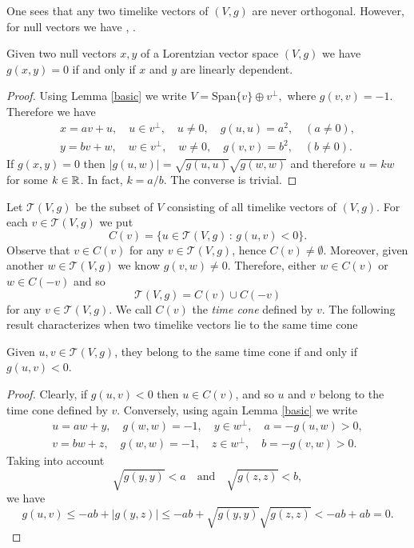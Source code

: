 One sees that any two timelike vectors of $(V,g)$ are never orthogonal.
However, for null vectors we have  \cite[Cor. 1.1.5]{sachs77}, \cite[p. 155]{oneill83}.

\begin{proposition} Given two null vectors $x,y$ of a Lorentzian vector space $(V,g)$ we have
$g(x,y)=0$ if and only if $x$ and $y$ are linearly dependent.
\end{proposition}

\begin{proof}
    Using Lemma \ref{basic} we write $V=\mathrm{Span}\{v\}\oplus v^{\perp},$ where $g(v,v)=-1$. Therefore we have
    \begin{align*}
        x=av+u, \quad u\in v^{\perp}, \quad u\neq 0, \quad g(u,u)=a^2, \quad (a\neq 0),\\
        y=bv+w, \quad w\in v^{\perp}, \quad w\neq 0, \quad g(v,v)=b^2, \quad (b\neq 0).
    \end{align*}
    If $g(x,y)=0$ then $\mid g(u,w)\mid = \sqrt{g(u,u)}\sqrt{g(w,w)}$ and therefore $u=kw$ for some $k\in \mathbb{R}$. In fact, $k=a/b$. The converse is trivial.
\end{proof}

Let $\mathcal{T}(V,g)$ be the subset of $V$ consisting of all timelike vectors of $(V,g)$. For each $v\in \mathcal{T}(V,g)$ we put
\[
C(v)=\{u\in\mathcal{T}(V,g)\, : \, g(u,v)<0 \}.
\]
Observe that $v\in C(v)$ for any $v\in \mathcal{T}(V,g)$, hence $C(v)\neq \emptyset$. Moreover, given another $w\in \mathcal{T}(V,g)$
we know $g(v,w)\neq 0$. Therefore, either $w\in C(v)$ or $w\in C(-v)$ and so
\[
\mathcal{T}(V,g)=C(v) \cup C(-v)
\]
for any $v\in \mathcal{T}(V,g)$. We call $C(v)$ the \emph{time cone} defined by $v$. The following result characterizes
when two timelike vectors lie to the same time cone \cite[Lemma 5.29]{oneill83}

\begin{lemma}\label{time_cone}
Given $u,v\in \mathcal{T}(V,g)$, they belong to the same time cone if and only if $g(u,v)<0$.
\end{lemma}

\begin{proof}
    Clearly, if $g(u,v)<0$ then $u\in C(v)$, and so $u$ and $v$ belong to the time cone defined by $v$. Conversely, using again Lemma \ref{basic} we write
    \begin{align*}
        u=aw+y, \quad g(w,w)=-1, \quad y\in w^{\perp}, \quad a=-g(u,w)>0,\\
        v=bw+z, \quad g(w,w)=-1, \quad z\in w^{\perp}, \quad b=-g(v,w)>0.
    \end{align*}
    Taking into account
    \[
    \sqrt{g(y,y)}<a \quad \mathrm{and} \quad \sqrt{g(z,z)}<b,
    \]
    we have
    \[
    g(u,v)\leq -ab+\mid g(y,z)\mid \leq -ab + \sqrt{g(y,y)}\sqrt{g(z,z)}<-ab+ab=0.
    \]
\end{proof}

